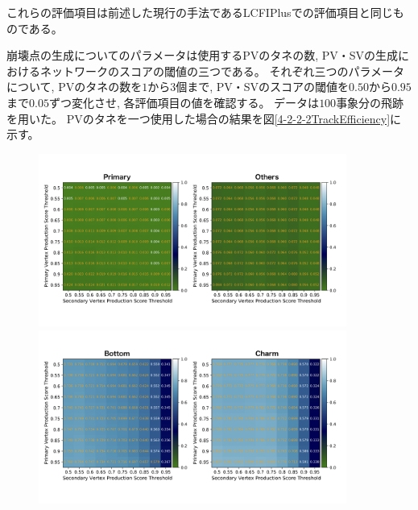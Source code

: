 これらの評価項目は前述した現行の手法であるLCFIPlusでの評価項目と同じものである。

崩壊点の生成についてのパラメータは使用するPVのタネの数, PV・SVの生成におけるネットワークのスコアの閾値の三つである。
それぞれ三つのパラメータについて, PVのタネの数を$1$から$3$個まで, PV・SVのスコアの閾値を$0.50$から$0.95$まで$0.05$ずつ変化させ, 各評価項目の値を確認する。
データは$100$事象分の飛跡を用いた。
PVのタネを一つ使用した場合の結果を図\ref{4-2-2-2TrackEfficiency}に示す。

\begin{figure}[htbp]
 \centering
  \begin{minipage}{0.95\textwidth}
   \centering
    \includegraphics[trim = 0 140 0 125, width=0.9\textwidth, clip]{Figure/4VertexFinderwithDL/4-2-2-2PrimaryOthers.png}
   \end{minipage}
   
   \begin{minipage}{0.95\textwidth}
   \centering
    \includegraphics[trim = 0 140 0 125, width=0.9\textwidth, clip]{Figure/4VertexFinderwithDL/4-2-2-2BottomCharm.png}
   \end{minipage}
   

\end{figure}
